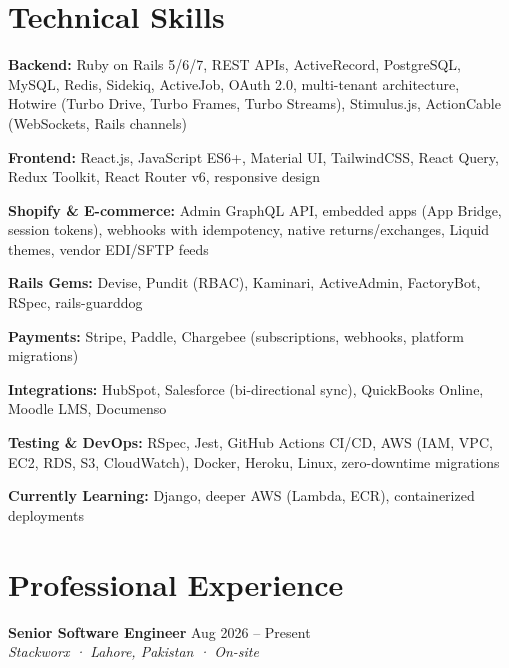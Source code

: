 \documentclass[10pt,a4paper]{article}
\newcommand{\jobtitle}[3]{
  {\normalsize\bfseries\color{headerblue}#1} \hfill {\small\color{subtle}#3}\\
  {\small\color{subtle}\textit{#2}}
}
\begin{document}
\section{Technical Skills}

\noindent
\textbf{\color{headerblue}Backend:} Ruby on Rails 5/6/7, REST APIs, ActiveRecord, PostgreSQL, MySQL, Redis, Sidekiq, ActiveJob, OAuth 2.0, multi-tenant architecture, Hotwire (Turbo Drive, Turbo Frames, Turbo Streams), Stimulus.js, ActionCable (WebSockets, Rails channels)

\noindent
\textbf{\color{headerblue}Frontend:} React.js, JavaScript ES6+, Material UI, TailwindCSS, React Query, Redux Toolkit, React Router v6, responsive design

\noindent
\textbf{\color{headerblue}Shopify \& E-commerce:} Admin GraphQL API, embedded apps (App Bridge, session tokens), webhooks with idempotency, native returns/exchanges, Liquid themes, vendor EDI/SFTP feeds

\noindent
\textbf{\color{headerblue}Rails Gems:} Devise, Pundit (RBAC), Kaminari, ActiveAdmin, FactoryBot, RSpec, rails-guarddog

\noindent
\textbf{\color{headerblue}Payments:} Stripe, Paddle, Chargebee (subscriptions, webhooks, platform migrations)

\noindent
\textbf{\color{headerblue}Integrations:} HubSpot, Salesforce (bi-directional sync), QuickBooks Online, Moodle LMS, Documenso

\noindent
\textbf{\color{headerblue}Testing \& DevOps:} RSpec, Jest, GitHub Actions CI/CD, AWS (IAM, VPC, EC2, RDS, S3, CloudWatch), Docker, Heroku, Linux, zero-downtime migrations

\noindent
\textbf{\color{headerblue}Currently Learning:} Django, deeper AWS (Lambda, ECR), containerized deployments

\section{Professional Experience}

\jobtitle{Senior Software Engineer}{Stackworx · Lahore, Pakistan · On-site}{Aug 2026 -- Present}
\end{document}
